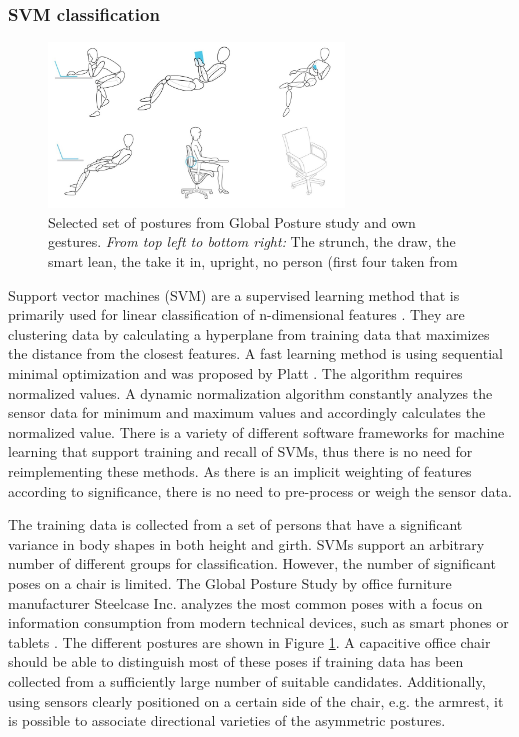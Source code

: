 \subsubsection*{SVM classification}
\begin{figure}[ht]
\centering
\includegraphics[width=0.7\textwidth]{images/smartchair_gps_poses}
\caption{Selected set of postures from Global Posture study and own gestures. \emph{From top left to bottom right:} The strunch, the draw, the smart lean, the take it in, upright, no person (first four taken from \cite{globalPosture}}
\label{fig:smartchair_gps_poses}
\end{figure}

Support vector machines (SVM) are a supervised learning method that is primarily used for linear classification of n-dimensional features \cite{hearst1998support}. They are clustering data by calculating a hyperplane from training data that maximizes the distance from the closest features. A fast learning method is using sequential minimal optimization and was proposed by Platt \cite{platt1999fast}. The algorithm requires normalized values. A dynamic normalization algorithm constantly analyzes the sensor data for minimum and maximum values and accordingly calculates the normalized value. There is a variety of different software frameworks for machine learning that support training and recall of SVMs, thus there is no need for reimplementing these methods. As there is an implicit weighting of features according to significance, there is no need to pre-process or weigh the sensor data.

The training data is collected from a set of persons that have a significant variance in body shapes in both height and girth. SVMs support an arbitrary number of different groups for classification. However, the number of significant poses on a chair is limited. The Global Posture Study by office furniture manufacturer Steelcase Inc. analyzes the most common poses with a focus on information consumption from modern technical devices, such as smart phones or tablets \cite{globalPosture}. The different postures are shown in Figure \ref{fig:smartchair_gps_poses}. A capacitive office chair should be able to distinguish most of these poses if training data has been collected from a sufficiently large number of suitable candidates. Additionally, using sensors clearly positioned on a certain side of the chair, e.g. the armrest, it is possible to associate directional varieties of the asymmetric postures.